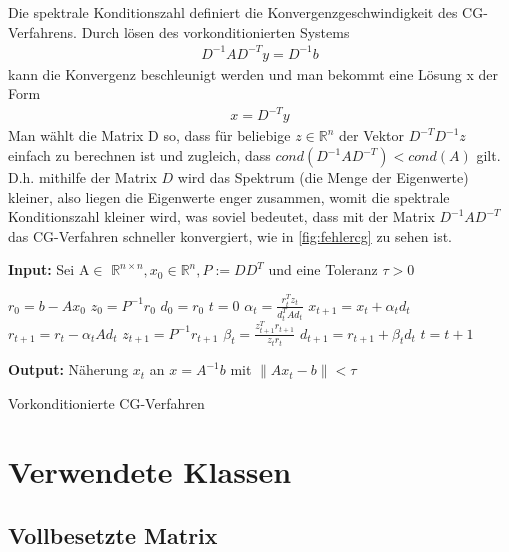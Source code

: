 \documentclass[12pt,a4paper]{scrartcl}
\numberwithin{equation}{section}
\numberwithin{myalgctr}{section}
\numberwithin{mytheoremctr}{subsection}
\numberwithin{mykorollarctr}{subsection}
\numberwithin{mylemmactr}{subsection}
\numberwithin{mybeispielctr}{subsection}
\newcommand\norm[1]{\left\lVert#1\right\rVert}
\begin{document}
	
	Die spektrale Konditionszahl definiert die Konvergenzgeschwindigkeit des CG-Verfahrens. Durch lösen des vorkonditionierten Systems
	\begin{align*}
		D^{-1}AD^{-T}y = D^{-1}b
	\end{align*}
	kann die Konvergenz beschleunigt werden und man bekommt eine Lösung x der Form 
	\begin{align*}
		x = D^{-T}y
	\end{align*}
	Man wählt die Matrix D so, dass für beliebige $z \in \mathbb{R}^{n}$ der Vektor $D^{-T}D^{-1}z$ einfach zu berechnen ist und zugleich, dass $cond(D^{-1}AD^{-T}) < cond(A)$ gilt. D.h. mithilfe der Matrix $D$ wird das Spektrum (die Menge der Eigenwerte) kleiner, also liegen die Eigenwerte enger zusammen, womit die spektrale Konditionszahl kleiner wird, was soviel bedeutet, dass mit der Matrix $D^{-1}AD^{-T}$ das CG-Verfahren schneller konvergiert, wie in \cref{fig:fehlercg} zu sehen ist. 
	\begin{algorithm}[H]
		\textbf{Input:} Sei A$\in$ $\mathbb{R}^{n\times n}, x_0 \in \mathbb{R}^{n}, P:=DD^{T}$ und eine Toleranz $\tau > 0$
		\begin{algorithmic}[1]
			\State $r_0 = b - Ax_0$
			\State $z_0 = P^{-1}r_0$
			\State $d_0 = r_0$
			\State $t = 0$
			\While{$ \norm{r_t} > \tau $}
			\State $\alpha_t = \frac{r_t^{T}z_t}{d_t^{T}Ad_t}$
			\State $x_{t+1} = x_{t} + \alpha_t d_t$
			\State $r_{t+1} = r_t - \alpha_t Ad_t$
			\State $z_{t+1} = P^{-1}r_{t+1}$
			\State $\beta_t = \frac{z_{t+1}^{T}r_{t+1}}{z_tr_t}$
			\State $d_{t+1} = r_{t+1} + \beta_td_t$
			\State $t = t + 1$
			\EndWhile
		\end{algorithmic}
		\textbf{Output:} Näherung $x_t$ an $x = A^{-1}b$ mit $\norm{Ax_t-b} < \tau$
		
		\caption{Vorkonditionierte CG-Verfahren} \label{alg:vcg}
	\end{algorithm}
	
	\newpage
	\appendix
	\section{Verwendete Klassen}
	\subsection{Vollbesetzte Matrix}
	
	
	\newpage
	\printbibliography
	\listoffigures
	\thispagestyle{firststyle}
	
\end{document}
